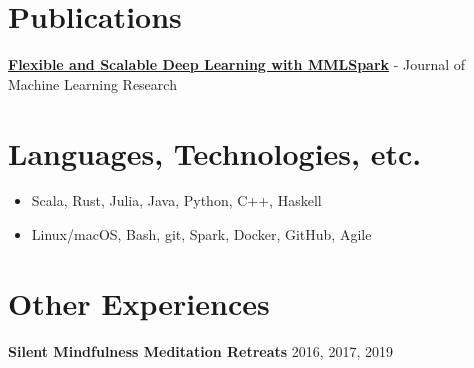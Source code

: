 \documentclass[overlapped]{res}
\begin{document}
\begin{resume}
    \section{Publications}
        {\bf \href{https://arxiv.org/pdf/1804.04031.pdf}{\underline{Flexible and Scalable Deep Learning with MMLSpark}}} - Journal of Machine Learning Research

    \section{Languages, Technologies, etc.}
    \begin{itemize} \itemsep-2pt
        \item
            Scala, Rust, Julia, Java, Python, C++, Haskell
        \item
            Linux/macOS, Bash, git, Spark, Docker, GitHub, Agile
    \end{itemize}

    \section{Other Experiences}

    {\bf Silent Mindfulness Meditation Retreats} \hfill 2016, 2017, 2019

\end{resume}
\end{document}
